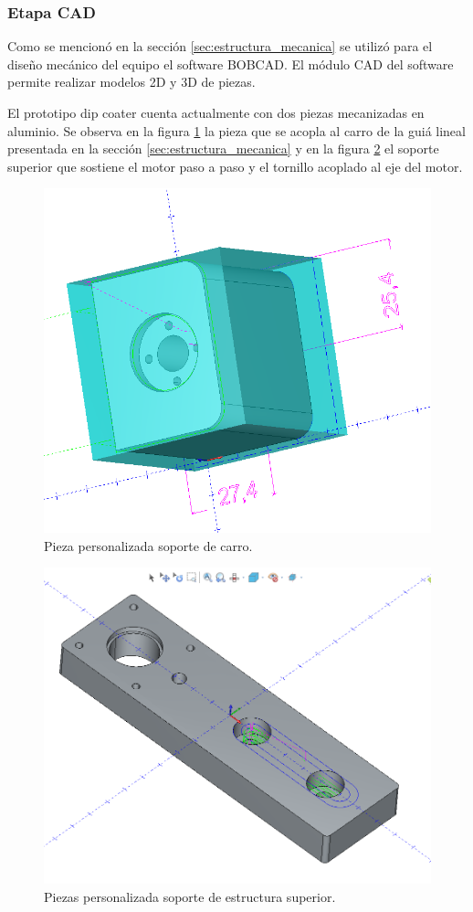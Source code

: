 \subsubsection{Etapa CAD}

Como se mencionó en la sección \ref{sec:estructura_mecanica} se utilizó para el diseño mecánico del equipo el software BOBCAD. El módulo CAD del software permite realizar modelos 2D y 3D de piezas.

El prototipo dip coater cuenta actualmente con dos piezas mecanizadas en aluminio. Se observa en la figura \ref{fig:carro} la pieza que se acopla al carro de la guiá lineal presentada en la sección \ref{sec:estructura_mecanica} y en la figura \ref{fig:estructura_superior} el soporte superior que sostiene el motor paso a paso y el  tornillo acoplado al eje del motor.

\begin{figure}[ht]
	\centering
	\includegraphics[width=.6\textwidth]{./Figures/3d_carro.png}
	\caption{Pieza personalizada soporte de carro.}
	\label{fig:carro}
\end{figure}



\begin{figure}[h]
	\centering
	\includegraphics[width=.6\textwidth]{./Figures/3d_top.png}
	\caption{Piezas personalizada soporte de estructura superior.}
	\label{fig:estructura_superior}
\end{figure}


